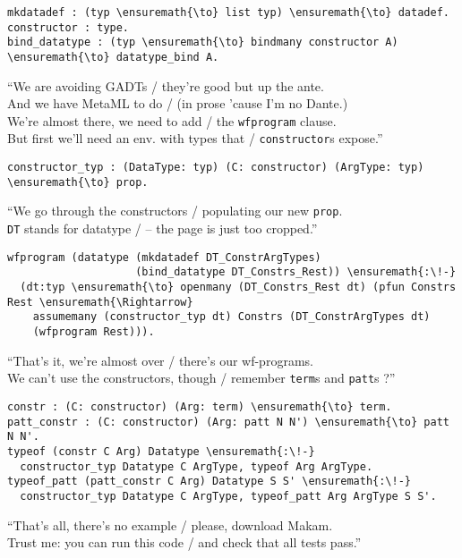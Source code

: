\begin{verbatim}
mkdatadef : (typ \ensuremath{\to} list typ) \ensuremath{\to} datadef.
constructor : type.
bind_datatype : (typ \ensuremath{\to} bindmany constructor A) \ensuremath{\to} datatype_bind A.
\end{verbatim}

\begin{versy}
``We are avoiding GADTs / they're good but up the ante. \\
And we have MetaML to do / (in prose 'cause I'm no Dante.) \\
We're almost there, we need to add / the \texttt{wfprogram} clause. \\
But first we'll need an env. with types that / \texttt{constructor}s expose.''
\end{versy}

\begin{verbatim}
constructor_typ : (DataType: typ) (C: constructor) (ArgType: typ) \ensuremath{\to} prop.
\end{verbatim}

\begin{versy}
``We go through the constructors / populating our new \texttt{prop}. \\
\texttt{DT} stands for datatype / -- the page is just too cropped.''
\end{versy}

\importantCodeblock{}

\begin{verbatim}
wfprogram (datatype (mkdatadef DT_ConstrArgTypes)
                    (bind_datatype DT_Constrs_Rest)) \ensuremath{:\!-}
  (dt:typ \ensuremath{\to} openmany (DT_Constrs_Rest dt) (pfun Constrs Rest \ensuremath{\Rightarrow}
    assumemany (constructor_typ dt) Constrs (DT_ConstrArgTypes dt)
    (wfprogram Rest))).
\end{verbatim}

\importantCodeblockEnd{}

\begin{versy}
``That's it, we're almost over / there's our wf-programs. \\
We can't use the constructors, though / remember \texttt{term}s and \texttt{patt}s ?''
\end{versy}

\begin{verbatim}
constr : (C: constructor) (Arg: term) \ensuremath{\to} term.
patt_constr : (C: constructor) (Arg: patt N N') \ensuremath{\to} patt N N'.
typeof (constr C Arg) Datatype \ensuremath{:\!-}
  constructor_typ Datatype C ArgType, typeof Arg ArgType.
typeof_patt (patt_constr C Arg) Datatype S S' \ensuremath{:\!-}
  constructor_typ Datatype C ArgType, typeof_patt Arg ArgType S S'.
\end{verbatim}

\begin{versy}
``That's all, there's no example / please, download Makam. \\
Trust me: you can run this code / and check that all tests pass.''
\end{versy}
